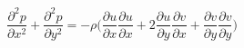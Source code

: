 \documentclass[preview]{standalone}
\begin{document}
\begin{equation*}
\frac{\partial^2 p}{\partial x^2} + \frac{\partial^2 p}{\partial y^2} = -\rho \Bigg(\frac{\partial u}{\partial x}\frac{\partial u}{\partial x}+2\frac{\partial u}{\partial y}\frac{\partial v}{\partial x}+\frac{\partial v}{\partial y}\frac{\partial v}{\partial y}\Bigg)
\end{equation*}
\end{document}
